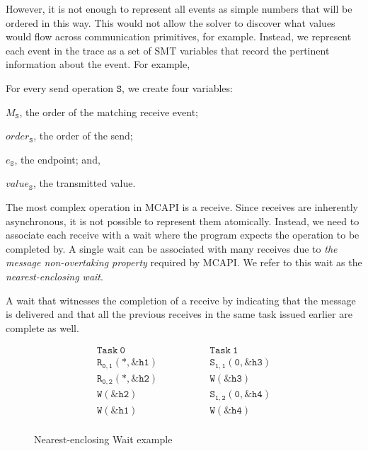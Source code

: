 However, it is not enough to represent all events as simple numbers
that will be ordered in this way. This would not allow the solver to
discover what values would flow across communication primitives, for
example. Instead, we represent each event in the trace as a set of SMT
variables that record the pertinent information about the event. For
example,

\begin{definition}[Send] \label{def:snd}
For every send operation $\mathtt{S}$, we create four variables:
\begin{compactenum}
\item $M_\mathtt{S}$, the order of the matching receive event;

\item $\mathit{order}_\mathtt{S}$, the order of the send;

\item $e_\mathtt{S}$, the endpoint; and,

\item $\mathit{value}_\mathtt{S}$, the transmitted value.
\end{compactenum}
\end{definition}

The most complex operation in MCAPI is a receive. Since receives are
inherently asynchronous, it is not possible to represent them
atomically. Instead, we need to associate each receive with a wait
where the program expects the operation to be completed by. A single
wait can be associated with many receives due to \emph{the message
  non-overtaking property} required by MCAPI. We refer to this wait as
the \emph{nearest-enclosing wait}.

\begin{definition} \label{def:nw}
A wait that witnesses the completion of a receive by indicating that
the message is delivered and that all the previous receives in the
same task issued earlier are complete as well.
\end{definition}

\begin{figure}[h]
\[
\begin{array}{l|l}
\;\;\;\;\;\;\;\;\mathtt{Task\ 0}\;\;\;\;\;\;\;\; & \;\;\;\;\;\;\;\; \mathtt{Task\ 1}\;\;\;\;\;\;\;\; \\
\hline
\;\;\;\;\;\;\;\;\mathtt{R_{0,1}(*,\&h1)}\;\;\;\;\;\;\;\; & \;\;\;\;\;\;\;\; \mathtt{S_{1,1}(0,\&h3)}\;\;\;\;\;\;\;\; \\
\;\;\;\;\;\;\;\;\mathtt{R_{0,2}(*,\&h2)}\;\;\;\;\;\;\;\; & \;\;\;\;\;\;\;\; \mathtt{W{(\&h3)}}\;\;\;\;\;\;\;\; \\
\;\;\;\;\;\;\;\;\mathtt{W{(\&h2)}}\;\;\;\;\;\;\;\; & \;\;\;\;\;\;\;\; \mathtt{S_{1,2}(0,\&h4)}\;\;\;\;\;\;\;\; \\
\;\;\;\;\;\;\;\;\mathtt{W{(\&h1)}}\;\;\;\;\;\;\;\; & \;\;\;\;\;\;\;\; \mathtt{W{(\&h4)}}\;\;\;\;\;\;\;\; \\
\end{array}
\]
\caption{Nearest-enclosing Wait example} \label{fig:nw}
\end{figure}

